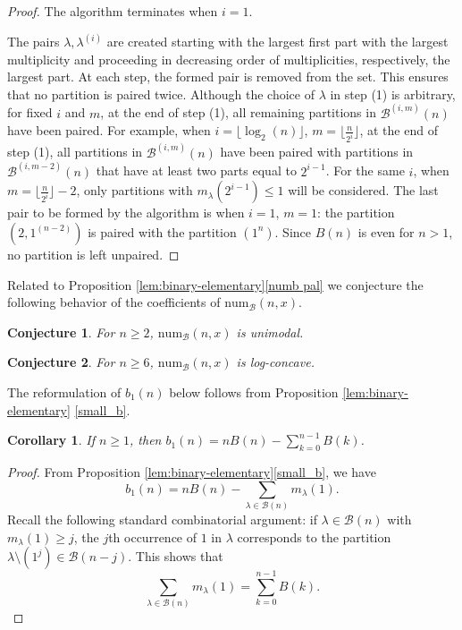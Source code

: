 \documentclass[reqno]{amsart}
\def\num{\mathrm{num}}
\def\B{\mathcal{B}}
\newtheorem{corollary}[theorem]{Corollary}
\newtheorem{conjecture}{Conjecture}
\theoremstyle{definition}
\begin{document}
\begin{proof}
The algorithm terminates when $i=1$.

The pairs $\lambda, \lambda^{(i)}$ are created starting with the largest first part with the largest multiplicity and  proceeding 
 in decreasing order of multiplicities, respectively, the largest part. At each step, the formed pair is removed from the set.  This ensures that no partition is paired twice. Although the choice of $\lambda$ in step (1) is arbitrary, for  fixed $i$ and $m$, at the end of step (1), all remaining partitions in $\mathcal B^{(i,m)}(n)$ have been paired. For example, when $i=\lfloor\log_2(n)\rfloor$, $m=\lfloor \frac{n}{2^i}\rfloor$, at the end of step (1), all partitions in $\mathcal B^{(i,m)}(n)$ have been paired with partitions in $\mathcal B^{(i,m-2)}(n)$ that have at least two parts equal to $2^{i-1}$. For the same $i$, when  $m=\lfloor \frac{n}{2^i}\rfloor-2$, only partitions with $m_\lambda(2^{i-1})\leq 1$ will be considered. The last pair to be formed by the algorithm is when $i=1$, $m=1$: the partition $(2, 1^{(n-2)})$ is paired with the partition $(1^n)$. Since $B(n)$ is even for $n>1$, no partition is left unpaired. 
\end{proof}
Related to Proposition \ref{lem:binary-elementary}\ref{numb pal} we conjecture the following behavior of the coefficients of $\num_{\B}(n,x)$.
\begin{conjecture}
    For $n\geq 2$, $\num_{\B}(n,x)$ is unimodal. 
\end{conjecture}
\begin{conjecture}\label{conj:binlog}
     For $n\geq 6$, $\num_{\B}(n,x)$ is log-concave.
\end{conjecture}

The reformulation of $b_1(n)$ below follows from Proposition \ref{lem:binary-elementary}  \ref{small_b}. 

\begin{corollary} \label{cor_b1} If $n\geq 1$, then  $b_1(n)=n B(n)-\sum_{k=0}^{n-1}B(k)$. 
    \end{corollary}
    \begin{proof}
        From Proposition \ref{lem:binary-elementary}\ref{small_b}, we have $$b_1(n)= n B(n)-\sum_{\lambda\in\mathcal B(n)}m_\lambda(1).$$ Recall the following standard combinatorial argument:  if $\lambda \in \mathcal B(n)$ with $m_\lambda(1)\geq j$, the $j$th occurrence of  $1$ in  $\lambda$ corresponds to the partition  $\lambda\setminus (1^j)\in\mathcal B(n-j)$. 
        This shows that   
 \begin{equation}\label{sum m1} \sum_{\lambda\in\mathcal B(n)}m_\lambda(1)=\sum_{k=0}^{n-1}B(k).\end{equation}
        \end{proof}
\end{document}
